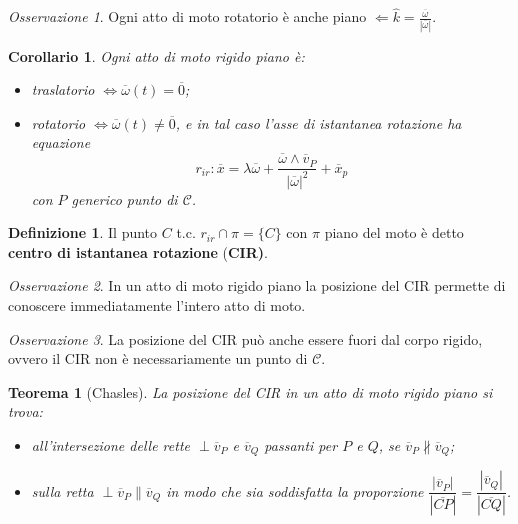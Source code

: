 \documentclass{book}
\theoremstyle{plain}
\newtheorem{teo}{Teorema}[chapter]
\theoremstyle{plain}
\theoremstyle{plain}
\theoremstyle{plain}
\newtheorem*{cor}{Corollario}
\theoremstyle{plain}
\theoremstyle{definition}
\newtheorem{defi}{Definizione}[chapter]
\theoremstyle{remark}
\newtheorem*{oss}{Osservazione}
\theoremstyle{definition}
\begin{document}
\begin{oss}
    Ogni atto di moto rotatorio è anche piano $\Longleftarrow \hat{k}=\frac{\overline{\omega}}{|\overline{\omega}|}$.
\end{oss}

\begin{cor}
    Ogni atto di moto rigido piano è:
    \begin{itemize}
        \item traslatorio $\iff \overline{\omega}(t)=\overline{0}$;
        \item rotatorio $\iff \overline{\omega}(t) \neq \overline{0}$, e in tal caso l'asse di istantanea rotazione ha equazione
        \begin{displaymath}
            r_{ir}: \overline{x}=\lambda \overline{\omega}+\frac{\overline{\omega} \wedge \overline{v}_{P}}{|\overline{\omega}|^{2}}+\overline{x}_{p}
        \end{displaymath}
        con $P$ generico punto di $\mathcal{C}$.
    \end{itemize}
\end{cor}
\begin{defi}
    Il punto $C$ t.c. $r_{ir} \cap \pi=\{C\}$ con $\pi$ piano del moto è detto \textbf{centro di istantanea rotazione} (\textbf{CIR)}.
\end{defi}

\begin{oss}
    In un atto di moto rigido piano la posizione del CIR permette di conoscere immediatamente l'intero atto di moto.
\end{oss}

\begin{oss}
    La posizione del CIR può anche essere fuori dal corpo rigido, ovvero il CIR non è necessariamente un punto di $\mathcal{C}$.
\end{oss}

\begin{teo}[Chasles]
    La posizione del CIR in un atto di moto rigido piano si trova:
    \begin{itemize}
        \item all'intersezione delle rette $\perp \overline{v}_{P}$ e $\overline{v}_{Q}$ passanti per $P$ e $Q$, se $\overline{v}_{P} \nparallel \overline{v}_{Q}$;
        \item sulla retta $\perp \overline{v}_{P} \parallel \overline{v}_{Q}$ in modo che sia soddisfatta la proporzione $\dfrac{\left|\overline{v}_{P}\right|}{|\overline{CP}|}=\dfrac{\left|\overline{v}_{Q}\right|}{|\overline{CQ}|}$.
    \end{itemize}
\end{teo}
\end{document}
